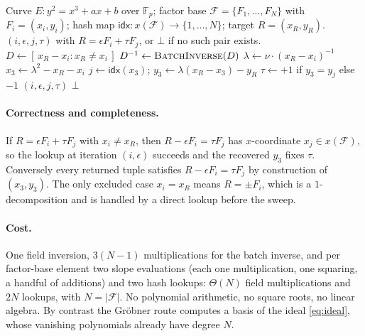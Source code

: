 \documentclass[10pt,a4paper]{article}
\theoremstyle{remark}
\newcommand{\FF}{\mathbb{F}}
\newcommand{\Fb}{\mathcal{F}}
\newcommand{\abs}[1]{\lvert #1 \rvert}
\begin{document}
\begin{algorithm}[t]
\caption{Prime-curve $2$-decomposition by direct subtraction}
\label{alg:prime}
\begin{algorithmic}[1]
\Require Curve $E: y^2 = x^3 + ax + b$ over $\FF_p$; factor base
  $\Fb = \{F_1,\ldots,F_N\}$ with $F_i = (x_i, y_i)$; hash map
  $\mathsf{idx}: x(\Fb) \to \{1,\ldots,N\}$; target $R = (x_R, y_R)$.
\Ensure $(i, \epsilon, j, \tau)$ with $R = \epsilon F_i + \tau F_j$, or
  $\bot$ if no such pair exists.
\State $D \gets [\,x_R - x_i : x_R \neq x_i\,]$ 
\State $D^{-1} \gets \textsc{BatchInverse}(D)$ 
    \State $\lambda \gets \nu \cdot (x_R - x_i)^{-1}$ 
    \State $x_3 \gets \lambda^2 - x_R - x_i$ 
      \State $j \gets \mathsf{idx}(x_3)$;\;
             $y_3 \gets \lambda (x_R - x_3) - y_R$
      \State $\tau \gets +1$ if $y_3 = y_j$ else $-1$
      \State \Return $(i, \epsilon, j, \tau)$
    \EndIf
  \EndFor
\EndFor
\State \Return $\bot$
\end{algorithmic}
\end{algorithm}

\paragraph{Correctness and completeness.} If $R = \epsilon F_i + \tau
F_j$ with $x_i \neq x_R$, then $R - \epsilon F_i = \tau F_j$ has
$x$-coordinate $x_j \in x(\Fb)$, so the lookup at iteration $(i,\epsilon)$
succeeds and the recovered $y_3$ fixes $\tau$. Conversely every returned
tuple satisfies $R - \epsilon F_i = \tau F_j$ by construction of
$(x_3, y_3)$. The only excluded case $x_i = x_R$ means $R = \pm F_i$,
which is a $1$-decomposition and is handled by a direct lookup before
the sweep.

\paragraph{Cost.} One field inversion, $3(N-1)$ multiplications for the
batch inverse, and per factor-base element two slope evaluations
(each one multiplication, one squaring, a handful of additions) and two
hash lookups: $\Theta(N)$ field multiplications and $2N$ lookups, with
$N = \abs{\Fb}$. No polynomial arithmetic, no square roots, no linear
algebra. By contrast the Gr\"obner route computes a basis of the ideal
\eqref{eq:ideal}, whose vanishing polynomials already have degree $N$.
\end{document}
